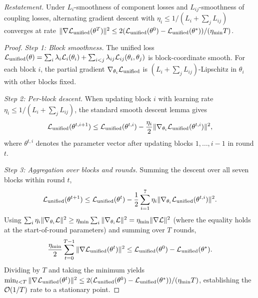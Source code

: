 \noindent\textit{Restatement.} Under $L_i$-smoothness of component losses and $L_{ij}$-smoothness of coupling losses, alternating gradient descent with $\eta_i\le 1/(L_i+\sum_j L_{ij})$ converges at rate $\|\nabla\mathcal{L}_{\mathrm{unified}}(\theta^T)\|^2\le 2(\mathcal{L}_{\mathrm{unified}}(\theta^0)-\mathcal{L}_{\mathrm{unified}}(\theta^*))/(\eta_{\min}T)$.

\begin{proof}
\textit{Step 1: Block smoothness.} The unified loss $\mathcal{L}_{\mathrm{unified}}(\theta) = \sum_i\lambda_i\mathcal{L}_i(\theta_i) + \sum_{i<j}\lambda_{ij}\mathcal{L}_{ij}(\theta_i,\theta_j)$ is block-coordinate smooth. For each block $i$, the partial gradient $\nabla_{\theta_i}\mathcal{L}_{\mathrm{unified}}$ is $(L_i+\sum_j L_{ij})$-Lipschitz in $\theta_i$ with other blocks fixed.

\textit{Step 2: Per-block descent.} When updating block $i$ with learning rate $\eta_i\le 1/(L_i+\sum_j L_{ij})$, the standard smooth descent lemma gives
\begin{equation}
\mathcal{L}_{\mathrm{unified}}(\theta^{t,i+1}) \le \mathcal{L}_{\mathrm{unified}}(\theta^{t,i}) - \frac{\eta_i}{2}\|\nabla_{\theta_i}\mathcal{L}_{\mathrm{unified}}(\theta^{t,i})\|^2,
\end{equation}
where $\theta^{t,i}$ denotes the parameter vector after updating blocks $1,\ldots,i{-}1$ in round $t$.

\textit{Step 3: Aggregation over blocks and rounds.} Summing the descent over all seven blocks within round $t$,
\begin{equation}
\mathcal{L}_{\mathrm{unified}}(\theta^{t+1}) \le \mathcal{L}_{\mathrm{unified}}(\theta^{t}) - \frac{1}{2}\sum_{i=1}^7\eta_i\|\nabla_{\theta_i}\mathcal{L}_{\mathrm{unified}}(\theta^{t,i})\|^2.
\end{equation}
Using $\sum_i\eta_i\|\nabla_{\theta_i}\mathcal{L}\|^2\ge\eta_{\min}\sum_i\|\nabla_{\theta_i}\mathcal{L}\|^2 = \eta_{\min}\|\nabla\mathcal{L}\|^2$ (where the equality holds at the start-of-round parameters) and summing over $T$ rounds,
\begin{equation}
\frac{\eta_{\min}}{2}\sum_{t=0}^{T-1}\|\nabla\mathcal{L}_{\mathrm{unified}}(\theta^t)\|^2
\le \mathcal{L}_{\mathrm{unified}}(\theta^0) - \mathcal{L}_{\mathrm{unified}}(\theta^*).
\end{equation}
Dividing by $T$ and taking the minimum yields $\min_{t<T}\|\nabla\mathcal{L}_{\mathrm{unified}}(\theta^t)\|^2\le 2(\mathcal{L}_{\mathrm{unified}}(\theta^0)-\mathcal{L}_{\mathrm{unified}}(\theta^*))/(\eta_{\min}T)$, establishing the $\mathcal{O}(1/T)$ rate to a stationary point.
\end{proof}


